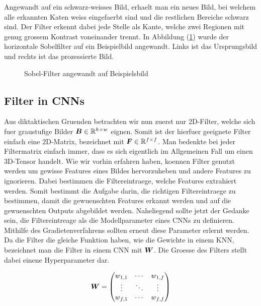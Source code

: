 Angewandt auf ein schwarz-weisses Bild, erhaelt man ein neues Bild, bei welchem alle erkannten
Katen weiss eingefaerbt sind und die restlichen Bereiche schwarz sind.
Der Filter erkennt dabei jede Stelle als Kante, welche zwei Regionen mit
genug grossem Kontrast voneinander trennt.
In Abbildung (\ref{fig:sobel_filter}) wurde der horizontale Sobelfilter auf ein
Beispielbild angewandt. Links ist das Ursprungsbild und rechts ist das
prozessierte Bild.


\begin{figure}[h!]

  \caption{Sobel-Filter angewandt auf Beispielsbild}
  \label{fig:sobel_filter}
\end{figure}

\para{}
\cite{wiki:sobel_operator}
\cite{deeplearning.ai:cnn}
\cite{wiki:kernel}


\subsection{Filter in CNNs}
Aus diktaktischen Gruenden betrachten wir nun zuerst
nur 2D-Filter, welche sich fuer graustufige Bilder
$\bm{B} \in \mathbb{R}^{h \times w}$ eignen. Somit ist der hierfuer geeignete
Filter einfach eine 2D-Matrix, bezeichnet mit $\bm{F} \in \mathbb{R}^{f \times
  f}$. Man bedenkte bei jeder Filtermatrix einfach immer, dass es sich
eigentlich im Allgemeinen Fall um einen 3D-Tensor handelt.
\para{}
Wie wir vorhin erfahren haben, koennen Filter genutzt werden um gewisse
Features eines Bildes hervorzuheben und andere Features zu ignorieren. Dabei
bestimmen die Filtereintraege, welche Features extrahiert werden. Somit bestimmt
die Aufgabe darin, die richtigen Filtereintraege zu bestimmen, damit die
gewuenschten Features erkannt werden und auf die gewuenschten Outputs abgebildet
werden. Naheliegend sollte jetzt der Gedanke sein, die Filtereintreage als die
Modellparameter eines CNNs zu definieren.
Mithilfe des Gradietenverfahrens sollten erneut diese Parameter
erlernt werden. \\
Da die Filter die gleiche Funktion haben, wie die Gewichte in einem KNN,
bezeichnet man die Filter in einem CNN mit $\bm{W}$. Die Groesse des Filters
stellt dabei einene Hyperparameter dar.

\begin{equation*}
  \bm{W} = \begin{pmatrix}
    w_{1,1} & \cdots & w_{1,f} \\
    \vdots & \ddots & \vdots \\
    w_{f,1} & \cdots & w_{f,f}
  \end{pmatrix}
\end{equation*}


